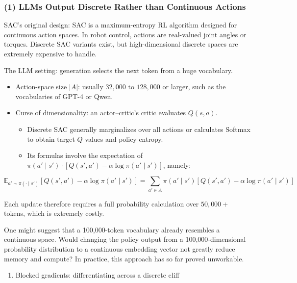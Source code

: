 \hypertarget{llms-output-discrete-rather-than-continuous-actions}{%
\subsubsection{(1) LLMs Output Discrete Rather than Continuous Actions}\label{llms-output-discrete-rather-than-continuous-actions}}

SAC's original design: SAC is a maximum-entropy RL algorithm designed for continuous action spaces. In robot control, actions are real-valued joint angles or torques. Discrete SAC variants exist, but high-dimensional discrete spaces are extremely expensive to handle.

The LLM setting: generation selects the next token from a huge vocabulary.

\begin{itemize}
\tightlist
\item
  Action-space size \(|A|\): usually \(32,000\) to \(128,000\) or larger, such as the vocabularies of GPT-4 or Qwen.
\item
  Curse of dimensionality: an actor--critic's critic evaluates \(Q(s,a)\).

  \begin{itemize}
  \tightlist
  \item
    Discrete SAC generally marginalizes over all actions or calculates Softmax to obtain target \(Q\) values and policy entropy.
  \item
{}
    Its formulas involve the expectation of \(\pi(a' \mid s') \cdot [Q(s',a') - \alpha \log \pi(a' \mid s')]\), namely:
  \end{itemize}
\end{itemize}

\[
\mathbb{E}_{a'\sim \pi(\cdot \mid s')}
\left[
Q(s',a')-\alpha\log\pi(a'\mid s')
\right]
=
\sum_{a'\in A}\pi(a'\mid s')
\left[
Q(s',a')-\alpha\log\pi(a'\mid s')
\right]
\]

Each update therefore requires a full probability calculation over \(50,000+\) tokens, which is extremely costly.

One might suggest that a 100,000-token vocabulary already resembles a continuous space. Would changing the policy output from a 100,000-dimensional probability distribution to a continuous embedding vector not greatly reduce memory and compute? In practice, this approach has so far proved unworkable.

\begin{enumerate}
\def\labelenumi{\arabic{enumi}.}
\tightlist
\item
  Blocked gradients: differentiating across a discrete cliff
\end{enumerate}

